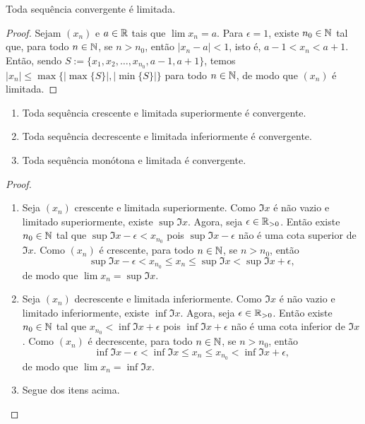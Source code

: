 \begin{proposition}
    Toda sequência convergente é limitada.
\end{proposition}

\begin{proof}
    Sejam $(x_n)$ e $a \in \mathbb{R}$ tais que $\lim x_n = a$. Para $\epsilon = 1$, existe $n_0 \in \mathbb{N}$ tal que, para todo $n \in \mathbb{N}$, se $n > n_0$, então $|x_n - a| < 1$, isto é, $a-1 < x_n < a+1$. Então, sendo $S := \{x_1, x_2, \ldots, x_{n_0}, a-1, a+1\}$, temos $|x_n| \leq \max\{|\max\{S\}|, |\min\{S\}|\}$ para todo $n \in \mathbb{N}$, de modo que $(x_n)$ é limitada. \blackproof
\end{proof}

\begin{theorem} \label{teo.calc1:convergencia_monotona}
    \leavevmode
        \begin{enumerate}[leftmargin=*, align=left, label=\textbf{(\alph*)}]
            \item Toda sequência crescente e limitada superiormente é convergente.
            \item Toda sequência decrescente e limitada inferiormente é convergente.
            \item Toda sequência monótona e limitada é convergente.
        \end{enumerate}
\end{theorem}

\begin{proof}
    \leavevmode
        \begin{enumerate}[leftmargin=*, align=left, label=\textbf{(\alph*)}]
            \item Seja $(x_n)$ crescente e limitada superiormente. Como $\Im{x}$ é não vazio e limitado superiormente, existe $\sup{\Im{x}}$. Agora, seja $\epsilon \in \mathbb{R}_{>0}$. Então existe $n_0 \in \mathbb{N}$ tal que $\sup{\Im{x}} - \epsilon < x_{n_0}$ pois $\sup{\Im{x}} - \epsilon$ não é uma cota superior de $\Im{x}$. Como $(x_n)$ é crescente, para todo $n \in \mathbb{N}$, se $n > n_0$, então
                \[
                    \sup{\Im{x}} - \epsilon < x_{n_0} \leq x_n \leq \sup{\Im{x}} < \sup{\Im{x}} + \epsilon,
                \]
            de modo que $\lim x_n = \sup{\Im{x}}$. \blackproof
            \item Seja $(x_n)$ decrescente e limitada inferiormente. Como $\Im{x}$ é não vazio e limitado inferiormente, existe $\inf{\Im{x}}$. Agora, seja $\epsilon \in \mathbb{R}_{>0}$. Então existe $n_0 \in \mathbb{N}$ tal que $x_{n_0} < \inf{\Im{x}} + \epsilon$ pois $\inf{\Im{x}} + \epsilon$ não é uma cota inferior de $\Im{x}$. Como $(x_n)$ é decrescente, para todo $n \in \mathbb{N}$, se $n > n_0$, então
                \[
                    \inf{\Im{x}} - \epsilon < \inf{\Im{x}} \leq x_n \leq x_{n_0} < \inf{\Im{x}} + \epsilon,
                \]
            de modo que $\lim x_n = \inf{\Im{x}}$. \blackproof
            \item Segue dos itens acima. \blackproof
        \end{enumerate}
\end{proof}

